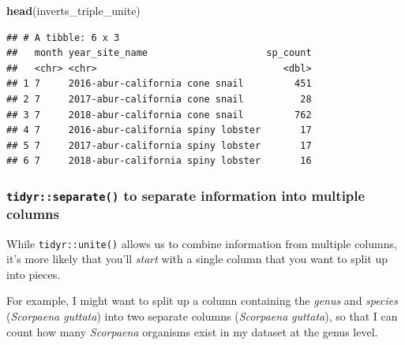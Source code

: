\documentclass[]{book}
\newenvironment{Shaded}{\begin{snugshade}}{\end{snugshade}}
\newcommand{\CommentTok}[1]{\textcolor[rgb]{0.56,0.35,0.01}{\textit{#1}}}
\newcommand{\DataTypeTok}[1]{\textcolor[rgb]{0.13,0.29,0.53}{#1}}
\newcommand{\KeywordTok}[1]{\textcolor[rgb]{0.13,0.29,0.53}{\textbf{#1}}}
\newcommand{\NormalTok}[1]{#1}
\newcommand{\OperatorTok}[1]{\textcolor[rgb]{0.81,0.36,0.00}{\textbf{#1}}}
\newcommand{\StringTok}[1]{\textcolor[rgb]{0.31,0.60,0.02}{#1}}
\begin{document}
\begin{Shaded}
\end{Shaded}

\begin{Shaded}
\begin{Highlighting}[]
\KeywordTok{head}\NormalTok{(inverts_triple_unite)}
\end{Highlighting}
\end{Shaded}

\begin{verbatim}
## # A tibble: 6 x 3
##   month year_site_name                     sp_count
##   <chr> <chr>                                 <dbl>
## 1 7     2016-abur-california cone snail         451
## 2 7     2017-abur-california cone snail          28
## 3 7     2018-abur-california cone snail         762
## 4 7     2016-abur-california spiny lobster       17
## 5 7     2017-abur-california spiny lobster       17
## 6 7     2018-abur-california spiny lobster       16
\end{verbatim}

\hypertarget{tidyrseparate-to-separate-information-into-multiple-columns}{%
\subsubsection{\texorpdfstring{\texttt{tidyr::separate()} to separate information into multiple columns}{tidyr::separate() to separate information into multiple columns}}\label{tidyrseparate-to-separate-information-into-multiple-columns}}

While \texttt{tidyr::unite()} allows us to combine information from multiple columns, it's more likely that you'll \emph{start} with a single column that you want to split up into pieces.

For example, I might want to split up a column containing the \emph{genus} and \emph{species} (\emph{Scorpaena guttata}) into two separate columns (\emph{Scorpaena} \textbar{} \emph{guttata}), so that I can count how many \emph{Scorpaena} organisms exist in my dataset at the genus level.
\end{document}
